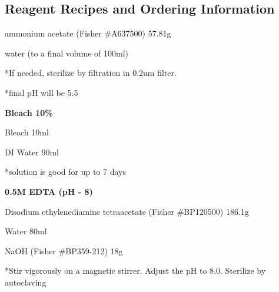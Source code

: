 \documentclass[11pt, oneside]{article}
\begin{document}
	\subsection{Reagent Recipes and Ordering Information}



		\hspace{5mm}{\bf 7.5M ammonium acetate}

			\hspace{2mm}ammonium acetate	(Fisher \#A637500) \hspace{5mm}		57.81g

			\hspace{2mm}water							(to a final volume of 100ml)

			\hspace{2mm}*If needed, sterilize by filtration in 0.2um filter. 

			\hspace{2mm}*final pH will be 5.5

		\vspace{5mm}

		{\bf Bleach 10\%}

			\hspace{2mm}Bleach\hspace{10mm}	10ml

			\hspace{2mm}DI Water\hspace{6mm}		90ml

			\hspace{2mm}*solution is good for up to 7 days

		\vspace{5mm}

		{\bf 0.5M EDTA (pH - 8)}

			\hspace{2mm}Disodium ethylenediamine tetraacetate 	(Fisher \#BP120500)\hspace{3mm}		186.1g

			\hspace{2mm}Water\hspace{95mm}												80ml

			\hspace{2mm}NaOH\hspace{55mm}	(Fisher \#BP359-212) \hspace{1mm}	18g

			\hspace{2mm}*Stir vigorously on a magnetic stirrer. Adjust the pH to 8.0. Sterilize by autoclaving

		\vspace{5mm}
\end{document}
